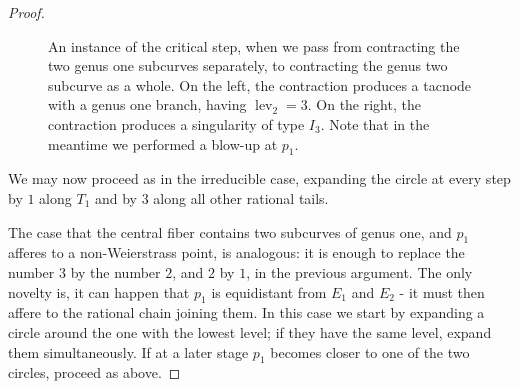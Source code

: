 \documentclass[11pt]{amsart}
\newcommand{\lev}{\operatorname{lev}}
\theoremstyle{plain}
\theoremstyle{definition}
\begin{document}
\begin{proof}
\begin{itemize}[leftmargin=.4cm]
\begin{figure}
   \caption{An instance of the critical step, when we pass from contracting the two genus one subcurves separately, to contracting the genus two subcurve as a whole. On the left, the contraction produces a tacnode with a genus one branch, having $\lev_2=3$. On the right, the contraction produces a singularity of type $I_3$. Note that in the meantime we performed a blow-up at $p_1$.}\label{fig:critical}
  \end{figure}
 We may now proceed as in the irreducible case, expanding the circle at every step by $1$ along $T_1$ and by $3$ along all other rational tails.
 \end{itemize}
 The case that the central fiber contains two subcurves of genus one, and $p_1$ afferes to a non-Weierstrass point, is analogous: it is enough to replace the number $3$ by the number $2$, and $2$ by $1$, in the previous argument. The only novelty is, it can happen that $p_1$ is equidistant from $E_1$ and $E_2$ - it must then affere to the rational chain joining them. In this case we start by expanding a circle around the one with the lowest level; if they have the same level, expand them simultaneously. If at a later stage $p_1$ becomes closer to one of the two circles, proceed as above.  

\end{proof}
\end{document}

